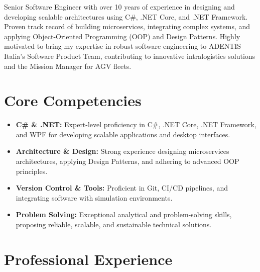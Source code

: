 \documentclass[11pt,a4paper,sans]{moderncv}
\begin{document}
\makecvtitle

\vspace{-15pt}
Senior Software Engineer with over 10 years of experience in designing and developing scalable architectures using C\#, .NET Core, and .NET Framework. Proven track record of building microservices, integrating complex systems, and applying Object-Oriented Programming (OOP) and Design Patterns. Highly motivated to bring my expertise in robust software engineering to ADENTIS Italia's Software Product Team, contributing to innovative intralogistics solutions and the Mission Manager for AGV fleets.

\section{Core Competencies}
\vspace{1pt}
\begin{itemize}
\item \textbf{C\# \& .NET:} Expert-level proficiency in C\#, .NET Core, .NET Framework, and WPF for developing scalable applications and desktop interfaces.
\item \textbf{Architecture \& Design:} Strong experience designing microservices architectures, applying Design Patterns, and adhering to advanced OOP principles.
\item \textbf{Version Control \& Tools:} Proficient in Git, CI/CD pipelines, and integrating software with simulation environments.
\item \textbf{Problem Solving:} Exceptional analytical and problem-solving skills, proposing reliable, scalable, and sustainable technical solutions.
\end{itemize}

\section{Professional Experience}
\vspace{1pt}

\vspace{3pt}
\end{document}
